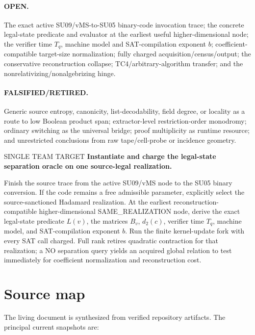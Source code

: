 \documentclass[11pt]{article}
\begin{document}
\paragraph{OPEN.}
The exact active SU09/vMS-to-SU05 binary-code invocation trace; the concrete
legal-state predicate and evaluator at the earliest useful
higher-dimensional node; the verifier time \(T_q\), machine model and
SAT-compilation exponent \(b\); coefficient-compatible target-size
normalization; fully charged acquisition/census/output; the conservative
reconstruction collapse; TC4/arbitrary-algorithm transfer; and the
nonrelativizing/nonalgebrizing hinge.

\paragraph{FALSIFIED/RETIRED.}
Generic source entropy, canonicity, list-decodability, field degree, or
locality as a route to low Boolean product span; extractor-level
restriction-order monodromy; ordinary switching as the universal bridge;
proof multiplicity as runtime resource; and unrestricted conclusions from
raw tape/cell-probe or incidence geometry.

\begin{candidatebox}{SINGLE TEAM TARGET}
\textbf{Instantiate and charge the legal-state separation oracle on one
source-legal realization.}

Finish the source trace from the active SU09/vMS node to the SU05 binary
conversion.  If the code remains a free admissible parameter, explicitly
select the source-sanctioned Hadamard realization.  At the earliest
reconstruction-compatible higher-dimensional SAME\_REALIZATION node,
derive the exact legal-state predicate \(L(v)\), the matrices \(B_v\),
\(d_2(c)\), verifier time \(T_q\), machine model, and SAT-compilation
exponent \(b\).  Run the finite kernel-update fork with every SAT call
charged.  Full rank retires quadratic contraction for that realization;
a NO separation query yields an acquired global relation to test
immediately for coefficient normalization and reconstruction cost.
\end{candidatebox}


\section{Source map}

The living document is synthesized from verified repository artifacts. The principal current
snapshots are:
\end{document}
